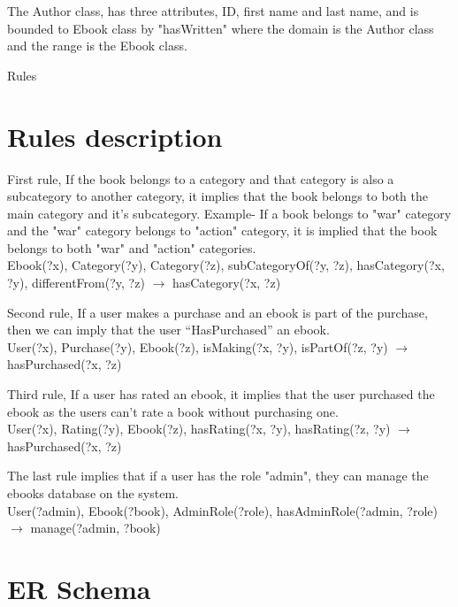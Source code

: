 ﻿\documentclass[a4paper,11pt]{article}
\begin{document}
The Author class, has three attributes, ID, first name and last name, and is bounded to Ebook class by "hasWritten" where the domain is the Author class and the range is the Ebook class. 

Rules

\section{Rules description}
First rule, If the book belongs to a category and that category is also a subcategory to another category, it implies that the book belongs to both the main category and it's subcategory. Example- If a book belongs to "war" category and the "war" category belongs to "action" category, it is implied that the book belongs to both "war" and "action" categories.\\
Ebook(?x), Category(?y), Category(?z), subCategoryOf(?y, ?z), hasCategory(?x, ?y), differentFrom(?y, ?z) $\rightarrow$ hasCategory(?x, ?z)

Second rule, If a user makes a purchase and an ebook is part of the purchase, then we can imply that the user “HasPurchased” an ebook. \\
User(?x), Purchase(?y), Ebook(?z), isMaking(?x, ?y), isPartOf(?z, ?y) $\rightarrow$ hasPurchased(?x, ?z)

Third rule, If a user has rated an ebook, it implies that the user purchased the ebook as the users can't rate a book without purchasing one. \\

User(?x), Rating(?y), Ebook(?z), hasRating(?x, ?y), hasRating(?z, ?y) $\rightarrow$ hasPurchased(?x, ?z)

The last rule implies that if a user has the role "admin", they can manage the ebooks database on the system. \\
User(?admin), Ebook(?book), AdminRole(?role), hasAdminRole(?admin, ?role) $\rightarrow$ manage(?admin, ?book)

\section{ER Schema}
\end{document}
